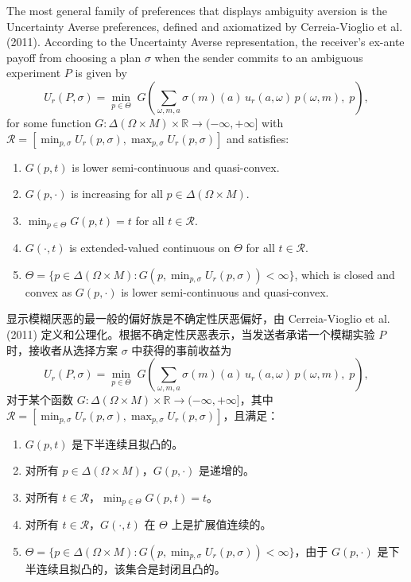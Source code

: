 \documentclass[12pt,a4paper]{article}
\theoremstyle{definition}
\theoremstyle{remark}
\newenvironment{original}{%
    \par\medskip\noindent%
    \begin{tcolorbox}[%
        colback=white,%
        colframe=black!50,%
        title=\textbf{Original English},%
        fonttitle=\small\bfseries,%
        left=0pt, right=0pt, top=2pt, bottom=2pt,%
        boxrule=0.5pt,%
        arc=0pt,%
        outer arc=0pt%
    ]%
    \small%
}{%
    \end{tcolorbox}%
}
\newenvironment{translation}{%
    \par\smallskip\noindent%
    \begin{tcolorbox}[%
        colback=blue!3!white,%
        colframe=blue!40!black,%
        title=\textbf{中文翻译},%
        fonttitle=\small\bfseries,%
        left=0pt, right=0pt, top=2pt, bottom=2pt,%
        boxrule=0.5pt,%
        arc=0pt,%
        outer arc=0pt%
    ]%
    \small\color{blue!60!black}%
}{%
    \end{tcolorbox}\medskip%
}
\begin{document}
\begin{original}
The most general family of preferences that displays ambiguity aversion is the Uncertainty Averse preferences, defined and axiomatized by Cerreia-Vioglio et al. (2011). According to the Uncertainty Averse representation, the receiver's ex-ante payoff from choosing a plan $\sigma$ when the sender commits to an ambiguous experiment $P$ is given by
\[
U_r(P, \sigma) = \min_{p \in \Theta} \; G\!\left( \sum_{\omega, m, a} \sigma(m)(a) \, u_r(a, \omega) \, p(\omega, m), \; p \right),
\]
for some function $G : \Delta(\Omega \times M) \times \mathbb{R} \to (-\infty, +\infty]$ with $\mathcal{R} = [\min_{p, \sigma} U_r(p, \sigma), \max_{p, \sigma} U_r(p, \sigma)]$ and satisfies:
\begin{enumerate}
    \item[(i)] $G(p, t)$ is lower semi-continuous and quasi-convex.
    \item[(ii)] $G(p, \cdot)$ is increasing for all $p \in \Delta(\Omega \times M)$.
    \item[(iii)] $\min_{p \in \Theta} G(p, t) = t$ for all $t \in \mathcal{R}$.
    \item[(iv)] $G(\cdot, t)$ is extended-valued continuous on $\Theta$ for all $t \in \mathcal{R}$.
    \item[(v)] $\Theta = \{ p \in \Delta(\Omega \times M) : G(p, \min_{p, \sigma} U_r(p, \sigma)) < \infty \}$, which is closed and convex as $G(p, \cdot)$ is lower semi-continuous and quasi-convex.
\end{enumerate}
\end{original}
\begin{translation}
显示模糊厌恶的最一般的偏好族是不确定性厌恶偏好，由 Cerreia-Vioglio et al. (2011) 定义和公理化。根据不确定性厌恶表示，当发送者承诺一个模糊实验 $P$ 时，接收者从选择方案 $\sigma$ 中获得的事前收益为
\[
U_r(P, \sigma) = \min_{p \in \Theta} \; G\!\left( \sum_{\omega, m, a} \sigma(m)(a) \, u_r(a, \omega) \, p(\omega, m), \; p \right),
\]
对于某个函数 $G : \Delta(\Omega \times M) \times \mathbb{R} \to (-\infty, +\infty]$，其中 $\mathcal{R} = [\min_{p, \sigma} U_r(p, \sigma), \max_{p, \sigma} U_r(p, \sigma)]$，且满足：
\begin{enumerate}
    \item[(i)] $G(p, t)$ 是下半连续且拟凸的。
    \item[(ii)] 对所有 $p \in \Delta(\Omega \times M)$，$G(p, \cdot)$ 是递增的。
    \item[(iii)] 对所有 $t \in \mathcal{R}$，$\min_{p \in \Theta} G(p, t) = t$。
    \item[(iv)] 对所有 $t \in \mathcal{R}$，$G(\cdot, t)$ 在 $\Theta$ 上是扩展值连续的。
    \item[(v)] $\Theta = \{ p \in \Delta(\Omega \times M) : G(p, \min_{p, \sigma} U_r(p, \sigma)) < \infty \}$，由于 $G(p, \cdot)$ 是下半连续且拟凸的，该集合是封闭且凸的。
\end{enumerate}
\end{translation}
\end{document}
